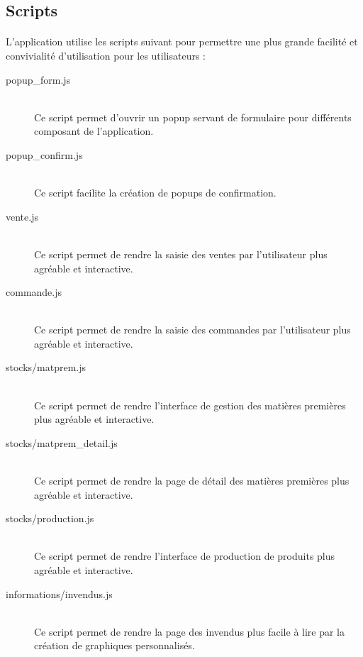     \subsection{Scripts}
        \paragraph{}
            L'application utilise les scripts suivant pour permettre une plus
            grande facilité et convivialité d'utilisation pour les
            utilisateurs :
        \begin{description}
            \item[popup\_form.js]\hfill \\
                Ce script permet d'ouvrir un popup servant de formulaire pour
                différents composant de l'application.
            \item[popup\_confirm.js]\hfill \\
                Ce script facilite la création de popups de confirmation.
            \item[vente.js]\hfill \\
                Ce script permet de rendre la saisie des ventes par 
                l'utilisateur plus agréable et interactive.
            \item[commande.js]\hfill \\
                Ce script permet de rendre la saisie des commandes par 
                l'utilisateur plus agréable et interactive.
            \item[stocks/matprem.js]\hfill \\
                Ce script permet de rendre l'interface de gestion des matières
                premières plus agréable et interactive.
            \item[stocks/matprem\_detail.js]\hfill \\
                Ce script permet de rendre la page de détail des matières
                premières plus agréable et interactive.
            \item[stocks/production.js]\hfill \\
                Ce script permet de rendre l'interface de production de
                produits plus agréable et interactive.
            \item[informations/invendus.js]\hfill \\
                Ce script permet de rendre la page des invendus plus facile
                à lire par la création de graphiques personnalisés.

\end{description}
